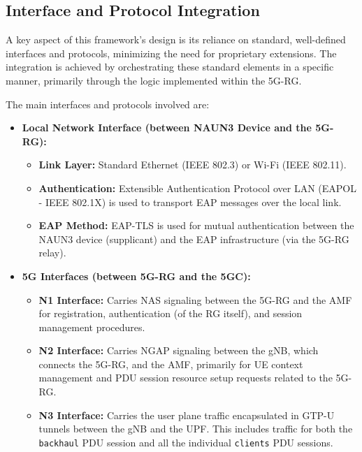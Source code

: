 \subsection{Interface and Protocol Integration}

A key aspect of this framework's design is its reliance on standard, well-defined interfaces and protocols, minimizing the need for proprietary extensions. The integration is achieved by orchestrating these standard elements in a specific manner, primarily through the logic implemented within the \ac{5G-RG}.

The main interfaces and protocols involved are:
\begin{itemize}
    \item {
        \textbf{Local Network Interface (between \ac{NAUN3} Device and the \ac{5G-RG}):}
        \begin{itemize}
            \item \textbf{Link Layer:} Standard Ethernet (\ac{IEEE} 802.3) or Wi-Fi (\ac{IEEE} 802.11).
            \item \textbf{Authentication:} Extensible Authentication Protocol over \ac{LAN} (\ac{EAPOL} - \ac{IEEE} 802.1X) is used to transport \ac{EAP} messages over the local link.
            \item \textbf{EAP Method:} \ac{EAP-TLS} is used for mutual authentication between the \ac{NAUN3} device (supplicant) and the \ac{EAP} infrastructure (via the \ac{5G-RG} relay).
        \end{itemize}
    }
    \item {
        \textbf{\ac{5G} Interfaces (between \ac{5G-RG} and the \ac{5GC}):}
        \begin{itemize}
            \item \textbf{N1 Interface:} Carries \ac{NAS} signaling between the \ac{5G-RG} and the \ac{AMF} for registration, authentication (of the \ac{RG} itself), and session management procedures.
            \item \textbf{N2 Interface:} Carries \ac{NGAP} signaling between the \ac{gNB}, which connects the \ac{5G-RG}, and the \ac{AMF}, primarily for \ac{UE} context management and \ac{PDU} session resource setup requests related to the \ac{5G-RG}.
            \item \textbf{N3 Interface:} Carries the user plane traffic encapsulated in \ac{GTP-U} tunnels between the \ac{gNB} and the \ac{UPF}. This includes traffic for both the \texttt{backhaul} \ac{PDU} session and all the individual \texttt{clients} \ac{PDU} sessions.

\end{itemize}}
\end{itemize}
